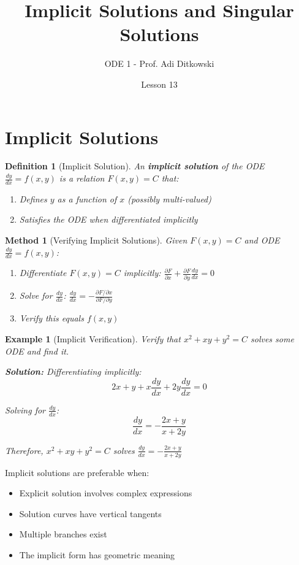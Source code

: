 \documentclass[12pt]{article}
\title{Implicit Solutions and Singular Solutions}
\author{ODE 1 - Prof. Adi Ditkowski}
\date{Lesson 13}
\newtheorem{definition}{Definition}
\newtheorem{method}{Method}
\newtheorem{example}{Example}
\begin{document}
\maketitle

\section{Implicit Solutions}

\begin{definition}[Implicit Solution]
An \textbf{implicit solution} of the ODE $\frac{dy}{dx} = f(x,y)$ is a relation $F(x,y) = C$ that:
\begin{enumerate}
    \item Defines $y$ as a function of $x$ (possibly multi-valued)
    \item Satisfies the ODE when differentiated implicitly
\end{enumerate}
\end{definition}

\begin{method}[Verifying Implicit Solutions]
Given $F(x,y) = C$ and ODE $\frac{dy}{dx} = f(x,y)$:
\begin{enumerate}
    \item Differentiate $F(x,y) = C$ implicitly: $\frac{\partial F}{\partial x} + \frac{\partial F}{\partial y}\frac{dy}{dx} = 0$
    \item Solve for $\frac{dy}{dx}$: $\frac{dy}{dx} = -\frac{\partial F/\partial x}{\partial F/\partial y}$
    \item Verify this equals $f(x,y)$
\end{enumerate}
\end{method}

\begin{example}[Implicit Verification]
Verify that $x^2 + xy + y^2 = C$ solves some ODE and find it.

\textbf{Solution:}
Differentiating implicitly:
$$2x + y + x\frac{dy}{dx} + 2y\frac{dy}{dx} = 0$$

Solving for $\frac{dy}{dx}$:
$$\frac{dy}{dx} = -\frac{2x + y}{x + 2y}$$

Therefore, $x^2 + xy + y^2 = C$ solves $\frac{dy}{dx} = -\frac{2x + y}{x + 2y}$
\end{example}

\begin{keypoint}
Implicit solutions are preferable when:
\begin{itemize}
    \item Explicit solution involves complex expressions
    \item Solution curves have vertical tangents
    \item Multiple branches exist
    \item The implicit form has geometric meaning
\end{itemize}
\end{keypoint}
\end{document}
